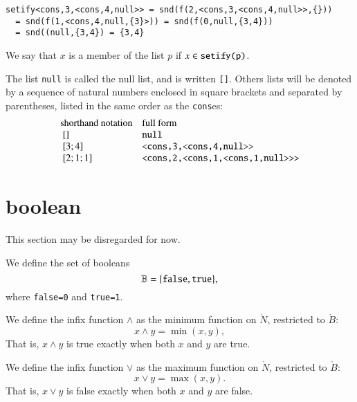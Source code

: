 \begin{example}
\begin{verbatim}
setify<cons,3,<cons,4,null>> = snd(f(2,<cons,3,<cons,4,null>>,{})) 
  = snd(f(1,<cons,4,null,{3}>)) = snd(f(0,null,{3,4})) 
  = snd((null,{3,4}) = {3,4}
\end{verbatim}
\end{example}

We say that $x$ is a member of the  list $p$ if $x\in\verb!setify(p)!$.


\begin{notation} The  list \verb!null! is called the null list, and is written \verb![]!.  Others lists will be denoted by a sequence of natural numbers enclosed in square brackets and separated by parentheses, listed in the same order as the \verb!cons!es:
$$
\begin{array}{lll}
\hbox{shorthand notation} & \hbox{full form}\\
~[]&\verb!null!\\
~[3;4]&\verb!<cons,3,<cons,4,null>>!\\
~[2;1;1]&\verb!<cons,2,<cons,1,<cons,1,null>>>!\\
\end{array}
$$
\end{notation}









\section{boolean}

\begin{note} This section may be disregarded for now.
\end{note}

We define the set of booleans
$$
\ring{B} = \{\verb!false!,\verb!true!\},
$$
where \verb!false=0! and \verb!true=1!.

We define the infix function $\land$ 
as the minimum function on $\ring{N}$, restricted to $\ring{B}$:
$$
x \land y = \min(x,y),
$$
That is, $x\land y$ is true exactly when both $x$ and $y$
are true.

We define the infix function $\lor$ as the maximum
function on $\ring{N}$, restricted to $\ring{B}$:
$$
x\lor y = \max(x,y).
$$
That is, $x\lor y$ is false exactly when both $x$ and $y$ are false.



